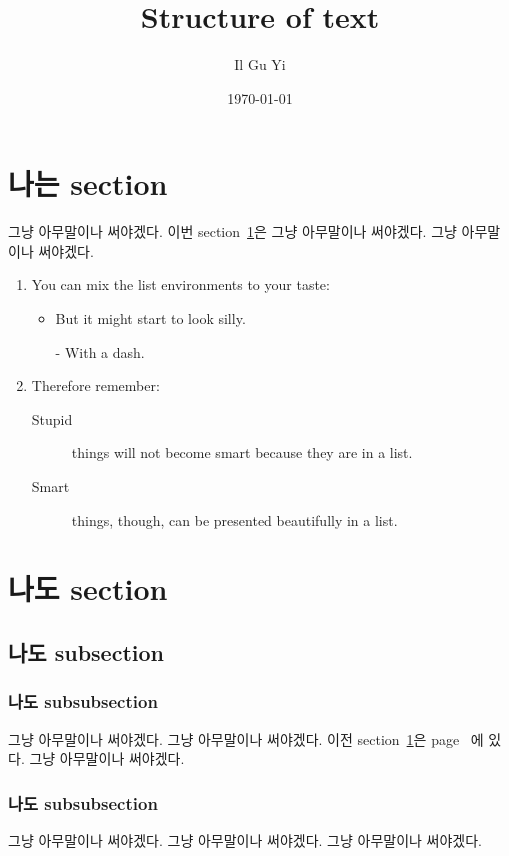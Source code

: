 \documentclass[a4paper,11pt]{article}
\author{Il Gu Yi}
\title{Structure of text}
\date{\today}
\begin{document}
\maketitle

\tableofcontents

\newpage
\section{나는 section}
\label{sec:this}
그냥 아무말이나 써야겠다.
이번 section~\ref{sec:this}은 그냥 아무말이나 써야겠다.
그냥 아무말이나 써야겠다.

\flushleft
\begin{enumerate}
  \item You can mix the list environments to your taste:
  \begin{itemize}
    \item But it might start to look silly.
    \item[-] With a dash.
  \end{itemize}
  \item Therefore remember:
  \begin{description}
    \item[Stupid] things will not
        become smart because they are in a list.
    \item[Smart] things, though, can be
        presented beautifully in a list.
  \end{description}
\end{enumerate}



\newpage
\section{나도 section}
\subsection{나도 subsection}
\subsubsection{나도 subsubsection}
그냥 아무말이나 써야겠다.
그냥 아무말이나 써야겠다.
이전 section~\ref{sec:this}은 page~\pageref{sec:this} 에 있다.
그냥 아무말이나 써야겠다.

\subsubsection*{나도 subsubsection}
그냥 아무말이나 써야겠다.
그냥 아무말이나 써야겠다.
그냥 아무말이나 써야겠다.
\end{document}
